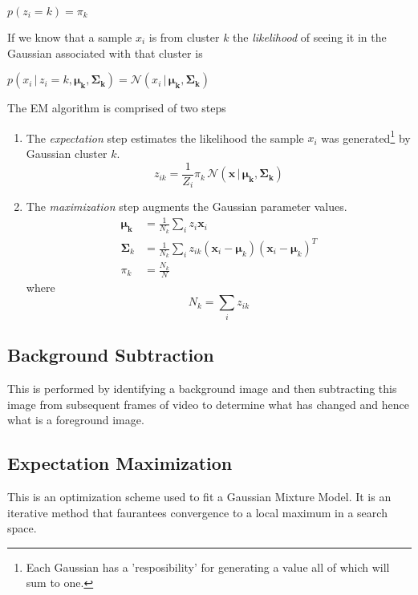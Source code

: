 \centerline{$p(z_i=k) = \pi_k $}

If we know that a sample $x_i$ is from cluster $k$ the \emph{likelihood} of seeing it in the Gaussian associated with that cluster is

\centerline{$ p(x_i\, |\, z_i = k, \bm{\mu_k}, \bm{\Sigma_k}) = \mathcal{N}(x_i\, |\,\bm{\mu_k}, \bm{\Sigma_k})$}

The EM algorithm is comprised of two steps

\begin{enumerate}
	\item The \emph{expectation} step estimates the likelihood the sample $x_i$ was generated\footnote{Each Gaussian has a 'resposibility' for generating a value all of which will sum to one.} by Gaussian cluster $k$.
	\begin{equation}
		z_{ik} = \frac{1}{Z_i}\pi_k\, \mathcal{N}(\bm{x}\,|\,\bm{\mu_k},\bm{\Sigma_k})
	\end{equation}

	\item The \emph{maximization} step augments the Gaussian parameter values.
	\begin{align}	
	\label{eq:mean}
	\bm{\mu_k} &= \frac{1}{N_k}\sum_i z_i \bm{x}_i \\
	\label{eq:covariance}
	\bm{\Sigma}_k &=  \frac{1}{N_k}\sum_i z_{ik} (\bm{x}_i - \bm{\mu}_k)(\bm{x}_i - \bm{\mu}_k)^T \\
	\label{eq:ratio}
	\pi_k &= \frac{N_k}{N}
	\end{align}
	where \newline
	\[N_k = \sum_{i} z_{ik}\]
\end{enumerate}


















\subsection{Background Subtraction}

This is performed by identifying a background image and then subtracting this image from subsequent frames of video to determine what has changed and hence what is a foreground image.

\subsection{Expectation Maximization}

This is an optimization scheme used to fit a Gaussian Mixture Model. It is an iterative method that faurantees convergence to a local maximum in a search space.